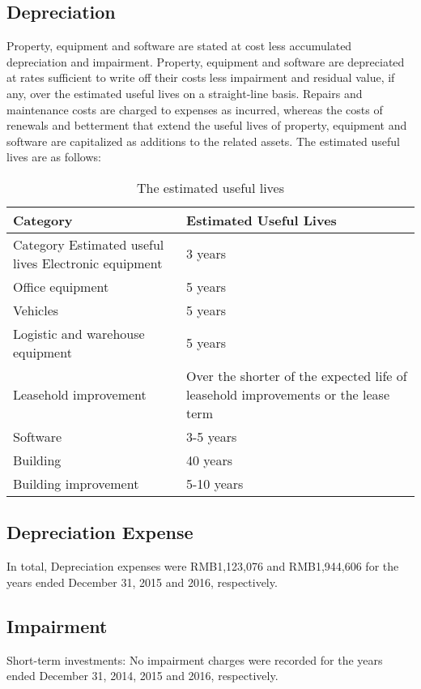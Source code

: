\subsection{Depreciation}

Property, equipment and software are stated at cost less accumulated depreciation and impairment. Property, equipment and software are depreciated at rates sufficient to write off their costs less impairment and residual value, if any, over the estimated useful lives on a straight-line basis. Repairs and maintenance costs are charged to expenses as incurred, whereas the costs of renewals and betterment that extend the useful lives of property, equipment and software are capitalized as additions to the related assets. The estimated useful lives are as follows:

\begin{table}[H]	
	\begin{center}
		\begin{tabular}{l|p{5cm}}
			\hline
			\textbf{\large{Category}}&\textbf{\large{Estimated Useful Lives}}\\
			\hline
			\rowcolor[gray]{.95}
			Category Estimated useful lives Electronic equipment &	3 years\\
			Office equipment &	5 years\\
			\rowcolor[gray]{.95}
			Vehicles&	5 years\\
			Logistic and warehouse equipment &	5 years\\
			\rowcolor[gray]{.95}
			Leasehold improvement&	Over the shorter of the expected life of leasehold improvements or the lease term\\			
			Software&	3-5 years\\
			\rowcolor[gray]{.95}
			Building &	40 years\\
			Building improvement &	5-10 years\\
		\end{tabular}
	\end{center}
	\caption{The estimated useful lives}\label{table:1}
\end{table}

\subsection{Depreciation Expense}

In total, Depreciation expenses were RMB1,123,076 and RMB1,944,606 for the years ended December 31, 2015 and 2016, respectively.


\subsection{Impairment}
Short-term investments: No impairment charges were recorded for the years ended December 31, 2014, 2015 and 2016, respectively.

